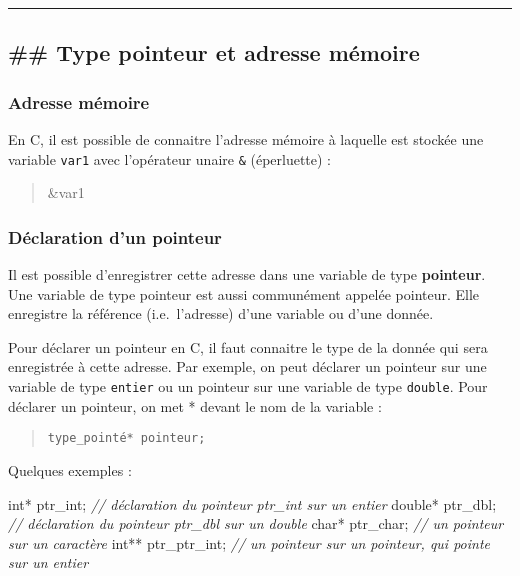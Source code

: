 \documentclass[11pt]{article}
\newenvironment{Shaded}{}{}
\newcommand{\DataTypeTok}[1]{\textcolor[rgb]{0.56,0.13,0.00}{{#1}}}
\newcommand{\CommentTok}[1]{\textcolor[rgb]{0.38,0.63,0.69}{\textit{{#1}}}}
\newcommand{\NormalTok}[1]{{#1}}
\begin{document}
\begin{center}\rule{0.5\linewidth}{0.5pt}\end{center}

    \hypertarget{type-pointeur-et-adresse-muxe9moire}{%
\subsection{\#\# Type pointeur et adresse
mémoire}\label{type-pointeur-et-adresse-muxe9moire}}

    \hypertarget{adresse-muxe9moire}{%
\subsubsection{Adresse mémoire}\label{adresse-muxe9moire}}

En C, il est possible de connaitre l'adresse mémoire à laquelle est
stockée une variable \texttt{var1} avec l'opérateur unaire \texttt{\&}
(éperluette) :

\begin{quote}
\&var1
\end{quote}

    \hypertarget{duxe9claration-dun-pointeur}{%
\subsubsection{Déclaration d'un
pointeur}\label{duxe9claration-dun-pointeur}}

Il est possible d'enregistrer cette adresse dans une variable de type
\textbf{pointeur}. Une variable de type pointeur est aussi communément
appelée pointeur. Elle enregistre la référence (i.e.~l'adresse) d'une
variable ou d'une donnée.

Pour déclarer un pointeur en C, il faut connaitre le type de la donnée
qui sera enregistrée à cette adresse. Par exemple, on peut déclarer un
pointeur sur une variable de type \texttt{entier} ou un pointeur sur une
variable de type \texttt{double}. Pour déclarer un pointeur, on met *
devant le nom de la variable :

\begin{quote}
\texttt{type\_pointé*\ pointeur;}
\end{quote}

Quelques exemples :

\begin{Shaded}
\begin{Highlighting}[]
    \DataTypeTok{int}\NormalTok{* ptr\_int; }\CommentTok{// déclaration du pointeur ptr\_int sur un entier}
    \DataTypeTok{double}\NormalTok{* ptr\_dbl; }\CommentTok{// déclaration du pointeur ptr\_dbl sur un double }
    \DataTypeTok{char}\NormalTok{* ptr\_char; }\CommentTok{// un pointeur sur un caractère}
    \DataTypeTok{int}\NormalTok{** ptr\_ptr\_int; }\CommentTok{// un pointeur sur un pointeur, qui pointe sur un entier}
\end{Highlighting}
\end{Shaded}
\end{document}
